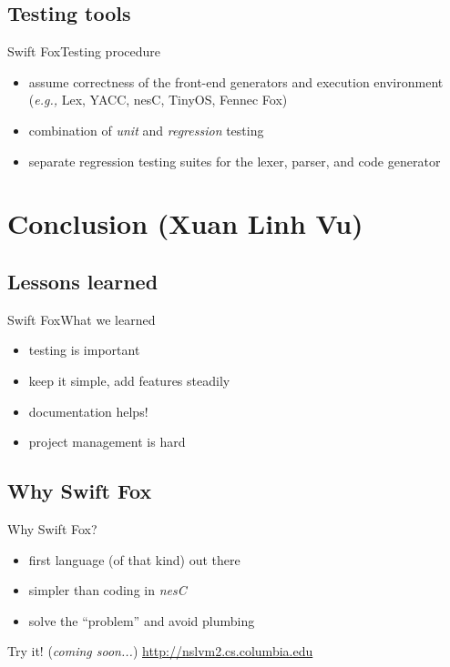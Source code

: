 \documentclass{beamer}
\begin{document}
\subsection[Testing]{Testing tools}

\begin{frame}{Swift Fox}{Testing procedure}
	\begin{itemize}
	\item assume correctness of the front-end generators and execution
	environment (\textit{e.g.,} Lex, YACC, nesC, TinyOS, Fennec Fox)
	\item combination of \textit{unit} and \textit{regression} testing
	\item separate regression testing suites for the lexer, parser, and
	code generator
	\end{itemize}
\end{frame}


\section[Conclusion]{Conclusion (Xuan Linh Vu)}

\subsection[Lessons]{Lessons learned}

\begin{frame}{Swift Fox}{What we learned}
	\begin{itemize}
	\item testing is important
	\item keep it simple, add features steadily
	\item documentation helps!
	\item {\color{blue} project management is hard}
	\end{itemize}
\end{frame}

\subsection[Why Swift Fox]{Why Swift Fox}

\begin{frame}{Why Swift Fox?}
	\begin{itemize}
	\item first language (of that kind) out there
	\item simpler than coding in \textit{nesC}
	\item {\color{blue} solve the ``problem'' and avoid plumbing}
	\end{itemize}
	\begin{block}{Try it! (\textit{coming soon...})}
		\centering
		\url{http://nslvm2.cs.columbia.edu}
	\end{block}
\end{frame}
\end{document}
